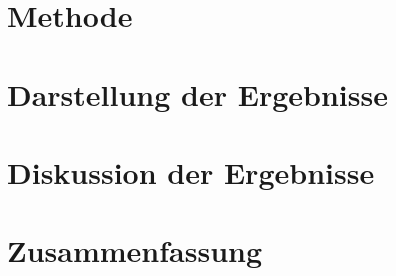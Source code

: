 \section{Methode} %



\newpage


\section{Darstellung der Ergebnisse} %



\newpage


\section{Diskussion der Ergebnisse} %



\newpage


\section{Zusammenfassung} %



\newpage

\begin{thebibliography}{9} %








 
\end{thebibliography}


